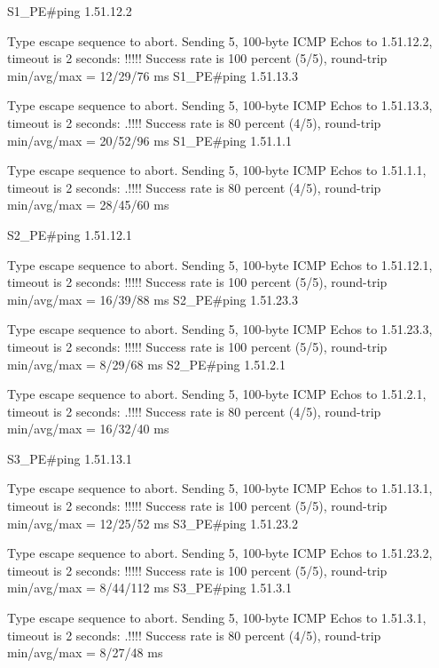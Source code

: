 \documentclass[10pt]{article}
\begin{document}
\begin{verbatim*}
	S1_PE#ping 1.51.12.2

	Type escape sequence to abort.
	Sending 5, 100-byte ICMP Echos to 1.51.12.2, timeout is 2 seconds:
	!!!!!
	Success rate is 100 percent (5/5), round-trip min/avg/max = 12/29/76 ms
	S1_PE#ping 1.51.13.3

	Type escape sequence to abort.
	Sending 5, 100-byte ICMP Echos to 1.51.13.3, timeout is 2 seconds:
	.!!!!
	Success rate is 80 percent (4/5), round-trip min/avg/max = 20/52/96 ms
	S1_PE#ping 1.51.1.1

	Type escape sequence to abort.
	Sending 5, 100-byte ICMP Echos to 1.51.1.1, timeout is 2 seconds:
	.!!!!
	Success rate is 80 percent (4/5), round-trip min/avg/max = 28/45/60 ms

	S2_PE#ping 1.51.12.1

	Type escape sequence to abort.
	Sending 5, 100-byte ICMP Echos to 1.51.12.1, timeout is 2 seconds:
	!!!!!
	Success rate is 100 percent (5/5), round-trip min/avg/max = 16/39/88 ms
	S2_PE#ping 1.51.23.3

	Type escape sequence to abort.
	Sending 5, 100-byte ICMP Echos to 1.51.23.3, timeout is 2 seconds:
	!!!!!
	Success rate is 100 percent (5/5), round-trip min/avg/max = 8/29/68 ms
	S2_PE#ping 1.51.2.1

	Type escape sequence to abort.
	Sending 5, 100-byte ICMP Echos to 1.51.2.1, timeout is 2 seconds:
	.!!!!
	Success rate is 80 percent (4/5), round-trip min/avg/max = 16/32/40 ms

	S3_PE#ping 1.51.13.1

	Type escape sequence to abort.
	Sending 5, 100-byte ICMP Echos to 1.51.13.1, timeout is 2 seconds:
	!!!!!
	Success rate is 100 percent (5/5), round-trip min/avg/max = 12/25/52 ms
	S3_PE#ping 1.51.23.2

	Type escape sequence to abort.
	Sending 5, 100-byte ICMP Echos to 1.51.23.2, timeout is 2 seconds:
	!!!!!
	Success rate is 100 percent (5/5), round-trip min/avg/max = 8/44/112 ms
	S3_PE#ping 1.51.3.1

	Type escape sequence to abort.
	Sending 5, 100-byte ICMP Echos to 1.51.3.1, timeout is 2 seconds:
	.!!!!
	Success rate is 80 percent (4/5), round-trip min/avg/max = 8/27/48 ms
\end{verbatim*}

\end{document}
